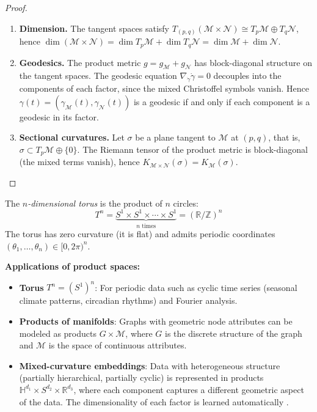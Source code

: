 \begin{proof}
\leavevmode
\begin{enumerate}
    \item \textbf{Dimension.} The tangent spaces satisfy $T_{(p,q)}(\mathcal{M} \times \mathcal{N}) \cong T_p\mathcal{M} \oplus T_q\mathcal{N}$, hence $\dim(\mathcal{M} \times \mathcal{N}) = \dim T_p\mathcal{M} + \dim T_q\mathcal{N} = \dim \mathcal{M} + \dim \mathcal{N}$.

    \item \textbf{Geodesics.} The product metric $g = g_\mathcal{M} + g_\mathcal{N}$ has block-diagonal structure on the tangent spaces. The geodesic equation $\nabla_{\dot\gamma}\dot\gamma = 0$ decouples into the components of each factor, since the mixed Christoffel symbols vanish. Hence $\gamma(t) = (\gamma_\mathcal{M}(t), \gamma_\mathcal{N}(t))$ is a geodesic if and only if each component is a geodesic in its factor.

    \item \textbf{Sectional curvatures.} Let $\sigma$ be a plane tangent to $\mathcal{M}$ at $(p,q)$, that is, $\sigma \subset T_p\mathcal{M} \oplus \{0\}$. The Riemann tensor of the product metric is block-diagonal (the mixed terms vanish), hence $K_{\mathcal{M}\times\mathcal{N}}(\sigma) = K_\mathcal{M}(\sigma)$. \qedhere
\end{enumerate}
\end{proof}

\begin{definition}\label{def:toro_n}
The \textit{$n$-dimensional torus} is the product of $n$ circles:
\[
T^n = \underbrace{S^1 \times S^1 \times \cdots \times S^1}_{n \text{ times}} = (\mathbb{R}/\mathbb{Z})^n
\]
The torus has zero curvature (it is flat) and admits periodic coordinates $(\theta_1, \ldots, \theta_n) \in [0, 2\pi)^n$.
\end{definition}

\textbf{Applications of product spaces:}

\begin{itemize}
    \item \textbf{Torus} $T^n = (S^1)^n$: For periodic data such as cyclic time series (seasonal climate patterns, circadian rhythms) and Fourier analysis.

    \item \textbf{Products of manifolds}: Graphs with geometric node attributes can be modeled as products $G \times \mathcal{M}$, where $G$ is the discrete structure of the graph and $\mathcal{M}$ is the space of continuous attributes.

    \item \textbf{Mixed-curvature embeddings}: Data with heterogeneous structure (partially hierarchical, partially cyclic) is represented in products $\mathbb{H}^{d_1} \times S^{d_2} \times \mathbb{R}^{d_3}$, where each component captures a different geometric aspect of the data. The dimensionality of each factor is learned automatically \citep{bronstein2017geometricdeeplearning}.
\end{itemize}

